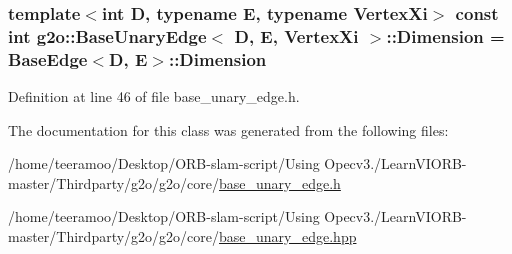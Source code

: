 \subsubsection[{\texorpdfstring{Dimension}{Dimension}}]{\setlength{\rightskip}{0pt plus 5cm}template$<$int D, typename E, typename Vertex\+Xi$>$ const int {\bf g2o\+::\+Base\+Unary\+Edge}$<$ D, E, Vertex\+Xi $>$\+::Dimension = {\bf Base\+Edge}$<$D, E$>$\+::Dimension\hspace{0.3cm}{\ttfamily [static]}}\hypertarget{classg2o_1_1BaseUnaryEdge_a4e584cf552998a34948d8d5b484f7fd3}{}\label{classg2o_1_1BaseUnaryEdge_a4e584cf552998a34948d8d5b484f7fd3}


Definition at line 46 of file base\+\_\+unary\+\_\+edge.\+h.



The documentation for this class was generated from the following files\+:\begin{DoxyCompactItemize}
\item 
/home/teeramoo/\+Desktop/\+O\+R\+B-\/slam-\/script/\+Using Opecv3./\+Learn\+V\+I\+O\+R\+B-\/master/\+Thirdparty/g2o/g2o/core/\hyperlink{base__unary__edge_8h}{base\+\_\+unary\+\_\+edge.\+h}\item 
/home/teeramoo/\+Desktop/\+O\+R\+B-\/slam-\/script/\+Using Opecv3./\+Learn\+V\+I\+O\+R\+B-\/master/\+Thirdparty/g2o/g2o/core/\hyperlink{base__unary__edge_8hpp}{base\+\_\+unary\+\_\+edge.\+hpp}\end{DoxyCompactItemize}
